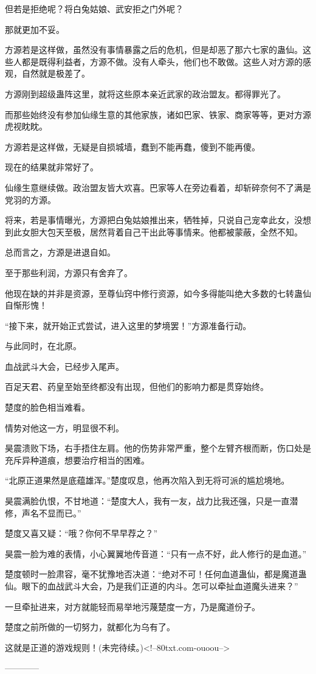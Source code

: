 \begin{this_body}
但若是拒绝呢？将白兔姑娘、武安拒之门外呢？

那就更加不妥。

方源若是这样做，虽然没有事情暴露之后的危机，但是却恶了那六七家的蛊仙。这些人都是既得利益者，方源不做。没有人牵头，他们也不敢做。这些人对方源的感观，自然就是极差了。

方源刚到超级蛊阵这里，就将这些原本亲近武家的政治盟友。都得罪光了。

而那些始终没有参加仙缘生意的其他家族，诸如巴家、铁家、商家等等，更对方源虎视眈眈。

方源若是这样做，无疑是自损城墙，蠢到不能再蠢，傻到不能再傻。

现在的结果就非常好了。

仙缘生意继续做。政治盟友皆大欢喜。巴家等人在旁边看着，却斩碎奈何不了满是党羽的方源。

将来，若是事情曝光，方源把白兔姑娘推出来，牺牲掉，只说自己宠幸此女，没想到此女胆大包天至极，居然背着自己干出此等事情来。他都被蒙蔽，全然不知。

总而言之，方源是进退自如。

至于那些利润，方源只有舍弃了。

他现在缺的并非是资源，至尊仙窍中修行资源，如今多得能叫绝大多数的七转蛊仙自惭形愧！

“接下来，就开始正式尝试，进入这里的梦境罢！”方源准备行动。

与此同时，在北原。

血战武斗大会，已经步入尾声。

百足天君、药皇至始至终都没有出现，但他们的影响力都是贯穿始终。

楚度的脸色相当难看。

情势对他这一方，明显很不利。

昊震溃败下场，右手捂住左肩。他的伤势非常严重，整个左臂齐根而断，伤口处是充斥异种道痕，想要治疗相当的困难。

“北原正道果然是底蕴雄浑。”楚度叹息，他再次陷入到无将可派的尴尬境地。

昊震满脸仇恨，不甘地道：“楚度大人，我有一友，战力比我还强，只是一直潜修，声名不显而已。”

楚度又喜又疑：“哦？你何不早早荐之？”

昊震一脸为难的表情，小心翼翼地传音道：“只有一点不好，此人修行的是血道。”

楚度顿时一脸肃容，毫不犹豫地否决道：“绝对不可！任何血道蛊仙，都是魔道蛊仙。眼下的血战武斗大会，乃是我们正道的内斗。怎可以牵扯血道魔头进来？”

一旦牵扯进来，对方就能轻而易举地污蔑楚度一方，乃是魔道份子。

楚度之前所做的一切努力，就都化为乌有了。

这就是正道的游戏规则！(未完待续。)<!--80txt.com-ouoou-->

------------

\end{this_body}

